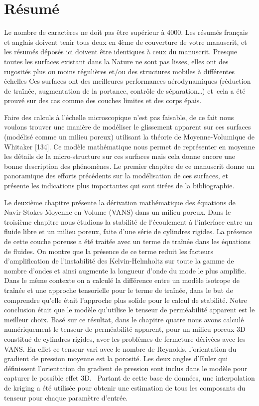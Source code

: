 \chapter*{Résumé}

Le nombre de caractères ne doit pas être supérieur à 4000. 
Les résumés français et anglais doivent tenir tous deux en 4ème de couverture de votre manuscrit, et les résumés déposés ici doivent être identiques à ceux du manuscrit.
Presque toutes les surfaces existant dans la Nature ne sont pas lisses, elles ont des rugosités plus ou moins régulières et/ou des structures mobiles à différentes échelles
Ces surfaces ont des meilleures performances aérodynamiques (réduction de traînée, augmentation de la portance, contrôle de séparation…) et cela a été prouvé sur des cas comme des couches limites et des corps épais.

Faire des calculs à l’échelle microscopique n’est pas faisable, de ce fait nous voulons trouver une manière de modéliser le glissement apparent sur ces surfaces (modélisé comme un milieu poreux) utilisant la théorie de Moyenne-Volumique de Whitaker [134].
Ce modèle mathématique nous permet de représenter en moyenne les détails de la micro-structure sur ces surfaces mais cela donne encore une bonne description des phénomènes.
Le premier chapitre de ce manuscrit donne un panoramique des efforts précédents sur la modélisation de ces surfaces, et présente les indications plus importantes qui sont tirées de la bibliographie.

Le deuxième chapitre présente la dérivation mathématique des équations de Navir-Stokes Moyenne en Volume (VANS) dans un milieu poreux.
Dans le troisième chapitre nous étudions la stabilité de l’écoulement à l’interface entre un fluide libre et un milieu poreux, faite d'une série de cylindres rigides.
La présence de cette couche poreuse a été traitée avec un terme de traînée dans les équations de fluides.
On montre que la présence de ce terme reduit les facteurs d’amplification de l’instabilité des Kelvin-Helmholtz sur toute la gamme de nombre d’ondes et ainsi augmente la longueur d’onde du mode le plus amplifie.
Dans le même contexte on a calculé la différence entre un modèle isotrope de traînée et une approche tensorielle pour le terme de traînée, dans le but de comprendre qu’elle était l’approche plus solide pour le calcul de stabilité. Notre conclusion était que le modèle qu'utilise le tenseur de perméabilité apparent est le meilleur choix.
Basé sur ce résultat, dans le chapitre quatre nous avons calculé numériquement le tenseur de perméabilité apparent, pour un milieu poreux 3D constitué de cylindres rigides, avec les problèmes de fermeture dérivées avec les VANS. 
En effet ce tenseur vari avec le nombre de Reynolds, l’orientation du gradient de pression moyenne est la porosité. 
Les deux angles d’Euler qui définissent l’orientation du gradient de pression sont inclus dans le modèle pour capturer le possible effet 3D.  Partant de cette base de données, une interpolation de kriging a été utilisée pour obtenir une estimation de tous les composants du tenseur pour chaque paramètre d’entrée.

